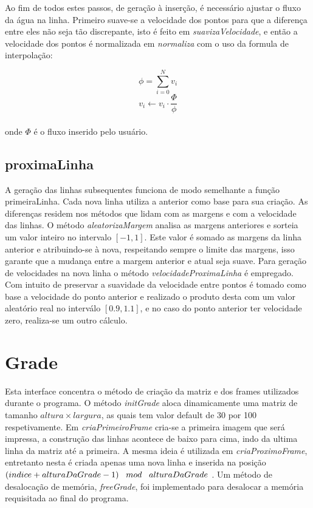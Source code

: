 \documentclass[a4paper,11pt]{article}
\begin{document}
Ao fim de todos estes passos, de gera\c{c}ão à inser\c{c}ão, é necessário ajustar o fluxo da água na linha. Primeiro suave-se a velocidade dos pontos	 para que a diferen\c{c}a entre eles não seja tão discrepante, isto é feito em \textit{suavizaVelocidade}, e então a velocidade dos pontos é normalizada em \textit{normaliza} com o uso da formula de interpola\c{c}ão: 

\begin{equation}
\phi = \sum_{i=0}^{N} v_i
\end{equation}
\begin{equation}
v_i \leftarrow v_i\cdot\dfrac{\Phi}{\phi}
\end{equation}
\\
onde $\Phi$ é o fluxo inserido pelo usuário.

\subsection{proximaLinha}

A gera\c{c}ão das linhas subsequentes funciona de modo semelhante a fun\c{c}ão primeiraLinha. Cada nova linha utiliza a anterior como base para sua cria\c{c}ão. As diferen\c{c}as residem nos métodos que lidam com as margens e com a velocidade das linhas. O método \textit{aleatorizaMargem} analisa as margens anteriores e sorteia um valor inteiro no intervalo $[-1,1]$. Este valor é somado as margens da linha anterior e atribuindo-se à nova, respeitando sempre o limite das margens, isso garante que a mudan\c{c}a entre a margem anterior e atual seja suave. Para gera\c{c}ão de velocidades na nova linha o método \textit{velocidadeProximaLinha} é empregado. Com intuito de preservar a suavidade da velocidade entre pontos é tomado como base a velocidade do ponto anterior e realizado o produto desta com um valor aleatório real no interválo $[0.9,1.1]$, e no caso do ponto anterior ter velocidade zero, realiza-se um outro cálculo.

\section{Grade}
Esta interface concentra o método de cria\c{c}ão da matriz e dos frames utilizados durante o programa. O método \textit{initGrade} aloca dinamicamente uma matriz de tamanho $altura \times largura$, as quais tem valor default de 30 por 100 respetivamente. Em \textit{criaPrimeiroFrame} cria-se a primeira imagem que será impressa, a constru\c{c}ão das linhas acontece de baixo para cima, indo da ultima linha da matriz até a primeira. A mesma ideia é utilizada em \textit{criaProximoFrame}, entretanto nesta é criada apenas uma nova linha e inserida na posi\c{c}ão $(indice + alturaDaGrade -1)\text{ \, } mod \text{ \, } alturaDaGrade$ . Um método de desaloca\c{c}ão de memória, \textit{freeGrade}, foi implementado para desalocar a memória requisitada ao final do programa.
\end{document}
